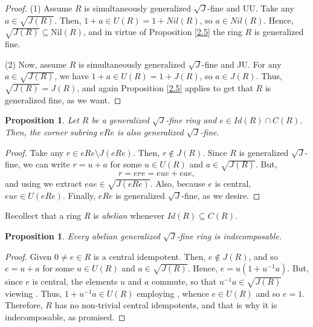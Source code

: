\documentclass[12pt]{amsart}
\newtheorem{proposition}[theorem]{Proposition}
\theoremstyle{definition}
\begin{document}
\begin{proof}
(1) Assume \( R \) is simultaneously generalized \(\sqrt{J}\)-fine and UU. Take any \( a \in \sqrt{J(R)} \). Then, \( 1 + a \in U(R) = 1 + Nil(R) \), so \( a \in Nil(R) \). Hence, \( \sqrt{J(R)} \subseteq \mathrm{Nil}(R) \), and in virtue of Proposition \ref{2.5} the ring \( R \) is generalized fine.
	
(2) Now, assume \( R \) is simultaneously generalized \(\sqrt{J}\)-fine and JU. For any \( a \in \sqrt{J(R)} \), we have \( 1 + a \in U(R) = 1 + J(R) \), so \( a \in J(R) \). Thus, \( \sqrt{J(R)} = J(R) \), and again Proposition \ref{2.5} applies to get that \( R \) is generalized fine, as we want.
\end{proof}

\begin{proposition}\label{2.20}
Let \( R \) be a generalized \(\sqrt{J}\)-fine ring and \( e \in Id(R) \cap C(R) \). Then, the corner subring \( eRe \) is also generalized \(\sqrt{J}\)-fine.
\end{proposition}

\begin{proof}
Take any \( r \in eRe \setminus J(eRe) \). Then, \( r \not\in J(R) \). Since \( R \) is generalized \(\sqrt{J}\)-fine, we can write \( r = u + a \) for some \( u \in U(R) \) and \( a \in \sqrt{J(R)} \). But,
\[
	r = ere = eue + eae,
\]
and using \cite[Lemma 2.8]{DDE} we extract \( eae \in \sqrt{J(eRe)} \). Also, because \( e \) is central, \( eue \in U(eRe) \). Finally, \( eRe \) is generalized \(\sqrt{J}\)-fine, as we desire.
\end{proof}

Recollect that a ring $R$ is \textit{abelian} whenever $Id(R)\subseteq C(R)$.

\begin{proposition}\label{2.25}
Every abelian generalized \(\sqrt{J}\)-fine ring is indecomposable.
\end{proposition}

\begin{proof}
Given \( 0 \neq e \in R \) is a central idempotent. Then, \( e \not\in J(R) \), and so \( e = u + a \) for some \( u \in U(R) \) and \( a \in \sqrt{J(R)} \). Hence, \( e = u(1 + u^{-1}a) \). But, since \( e \) is central, the elements \( u \) and \( a \) commute, so that \( u^{-1}a \in \sqrt{J(R)} \) viewing \cite[Lemma2.1(1)]{DDE}. Thus, \( 1 + u^{-1}a \in U(R) \) employing \cite[Lemma2.1(3)]{DDE}, whence \( e \in U(R) \) and so \( e = 1 \). Therefore, \( R \) has no non-trivial central idempotents, and that is why it is indecomposable, as promised.
\end{proof}
\end{document}
